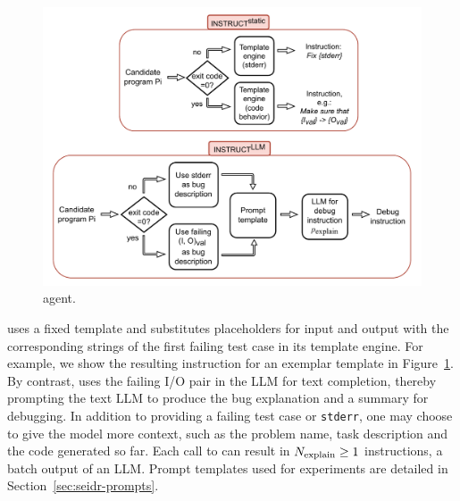 \begin{figure}[H]
    \centering
    \includegraphics[width=\linewidth,trim={0mm 0mm 0mm 0mm}]{images/codex-for-psb-seidr-instruct-2.drawio.pdf}
    \caption{\instruct{} agent.}
    \label{fig:method-instruct}
\end{figure}

\instructs{} uses a fixed template and substitutes placeholders for input and output with the corresponding strings of the first failing test case in its template engine.
For example, we show the resulting instruction for an exemplar template in Figure~\ref{fig:method-instruct}.
By contrast, \instructllm{} uses the failing I/O pair in the LLM for text completion, thereby prompting the text LLM to produce the bug explanation and a summary for debugging. 
In addition to providing a failing test case or \texttt{stderr}, one may choose to give the model \textmodel{} more context, such as the problem name, task description and the code generated so far. 
Each call to \textmodel{} can result in $N_\text{explain}{}\ge1$ instructions, a batch output of an LLM.
Prompt templates used for experiments are detailed in Section~\ref{sec:seidr-prompts}.








